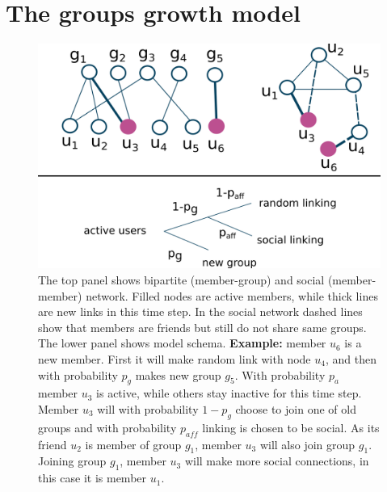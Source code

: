 \section{The groups growth model}


\begin{figure}[H]
	\centering
	\includegraphics[scale=0.5]{Figures/figures/test.png}
	\caption{The top panel shows bipartite (member-group) and social (member-member) network. Filled nodes are active members, while thick lines are new links in this time step. In the social network dashed lines show that members are friends but still do not share same groups. The lower panel shows model schema. \textbf{Example:} member $u_6$ is a new member. First it will make random link  with node $u_4$, and then with probability $p_g$ makes new group $g_5$. With probability $p_a$ member $u_3$ is active, while others stay inactive for this time step. Member $u_3$ will with probability $1-p_g$ choose to join one of old groups and with probability $p_{aff}$ linking is chosen to be social. As its friend $u_2$ is member of group $g_1$, member $u_3$ will also join group $g_1$. Joining group $g_1$, member $u_3$ will make more social connections, in this case it is member $u_1$.}
	\label{fig:schema}
\end{figure}

